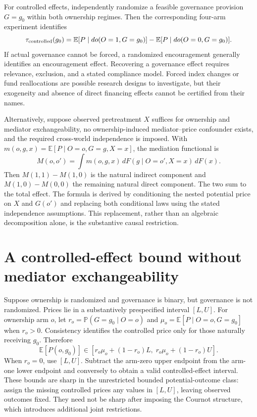 \documentclass[11pt]{article}
\newcommand{\E}{\mathbb E}
\newcommand{\Prb}{\mathbb P}
\begin{document}
For controlled effects, independently randomize a feasible governance provision $G=g_0$ within both ownership regimes. Then the corresponding four-arm experiment identifies
\[
 \tau_{\rm controlled}(g_0)
 =\E[P\mid do(O=1,G=g_0)]-\E[P\mid do(O=0,G=g_0)].
\]
If actual governance cannot be forced, a randomized encouragement generally identifies an encouragement effect. Recovering a governance effect requires relevance, exclusion, and a stated compliance model. Forced index changes or fund reallocations are possible research designs to investigate, but their exogeneity and absence of direct financing effects cannot be certified from their names.

Alternatively, suppose observed pretreatment $X$ suffices for ownership and mediator exchangeability, no ownership-induced mediator--price confounder exists, and the required cross-world independence is imposed. With $m(o,g,x)=\E[P\mid O=o,G=g,X=x]$, the mediation functional is
\[
 M(o,o')=\int m(o,g,x)\,dF(g\mid O=o',X=x)\,dF(x).
\]
Then $M(1,1)-M(1,0)$ is the natural indirect component and $M(1,0)-M(0,0)$ the remaining natural direct component. The two sum to the total effect. The formula is derived by conditioning the nested potential price on $X$ and $G(o')$ and replacing both conditional laws using the stated independence assumptions. This replacement, rather than an algebraic decomposition alone, is the substantive causal restriction.

\section*{A controlled-effect bound without mediator exchangeability}
Suppose ownership is randomized and governance is binary, but governance is not randomized. Prices lie in a substantively prespecified interval $[L,U]$. For ownership arm $o$, let $r_o=\Prb(G=g_0\mid O=o)$ and $\mu_o=\E[P\mid O=o,G=g_0]$ when $r_o>0$. Consistency identifies the controlled price only for those naturally receiving $g_0$. Therefore
\[
 \E[P(o,g_0)]\in
 [r_o\mu_o+(1-r_o)L,\;r_o\mu_o+(1-r_o)U].
\]
When $r_o=0$, use $[L,U]$. Subtract the arm-zero upper endpoint from the arm-one lower endpoint and conversely to obtain a valid controlled-effect interval. These bounds are sharp in the unrestricted bounded potential-outcome class: assign the missing controlled prices any values in $[L,U]$, leaving observed outcomes fixed. They need not be sharp after imposing the Cournot structure, which introduces additional joint restrictions.
\end{document}
